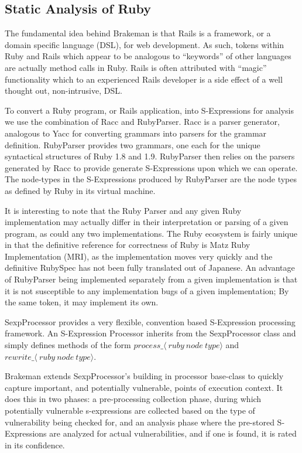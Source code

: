 \documentclass[conference]{IEEEtran}
\begin{document}
\subsection{Static Analysis of Ruby}

The fundamental idea behind Brakeman is that Rails is a framework, or a
domain specific language (DSL), for web development.  As such, tokens within Ruby and
Rails which appear to be analogous to ``keywords'' of other languages are
actually method calls in Ruby.  Rails is often attributed with ``magic''
functionality which to an experienced Rails developer is a side effect of a well
thought out, non-intrusive, DSL.

To convert a Ruby program, or Rails application, into S-Expressions for analysis
we use the combination of Racc\cite{racc} and RubyParser\cite{ruby_parser}.  Racc is a parser
generator, analogous to Yacc\cite{yacc} for converting grammars into parsers for the
grammar definition.  RubyParser provides two grammars, one each for the unique
syntactical structures of Ruby 1.8 and 1.9.  RubyParser then relies on the
parsers generated by Racc to provide generate S-Expressions upon which we can
operate.  The node-types in the S-Expressions produced by RubyParser are the
node types as defined by Ruby\cite{ruby_node_types} in its virtual machine.

It is interesting to note that the Ruby Parser and any given Ruby implementation
may actually differ in their interpretation or parsing of a given program, as
could any two implementations.  The Ruby ecosystem is fairly unique in that the
definitive reference for correctness of Ruby is Matz Ruby Implementation (MRI),
as the implementation moves very quickly and the definitive RubySpec has not
been fully translated out of Japanese.  An advantage of RubyParser being
implemented separately from a given implementation is that it is not susceptible
to any implementation bugs of a given implementation;  By the same token, it may
implement its own.

SexpProcessor\cite{sexp_processor} provides a very flexible, convention based
S-Expression processing framework.  An S-Expression Processor inherits from the
SexpProcessor class and simply defines methods of the form
$process\_\langle~ruby~node~type\rangle$ and
$rewrite\_\langle~ruby~node~type\rangle$.

Brakeman extends SexpProcessor's building in processor base-class to quickly
capture important, and potentially vulnerable, points of execution context.  It
does this in two phases: a pre-processing collection phase, during which potentially
vulnerable s-expressions are collected based on the type of vulnerability being
checked for, and an analysis phase where the pre-stored S-Expressions are
analyzed for actual vulnerabilities, and if one is found, it is rated in its
confidence.
\end{document}
